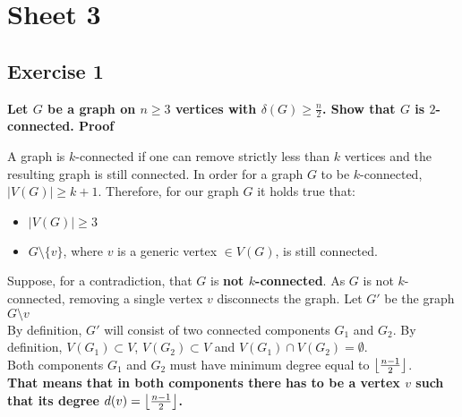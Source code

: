 \section*{Sheet 3}
\subsection*{Exercise 1}
\boldmath 
\textbf{Let $G$ be a graph on $n \geq 3$ vertices with $\delta(G) \geq \frac{n}{2}$. Show that $G$ is
$2$-connected.
\spacer
Proof} 
\unboldmath

A graph is $k$-connected if one can remove strictly less than $k$ vertices and the resulting graph is still connected. In order for a graph $G$ to be $k$-connected, $|V(G)| \geq k + 1$. Therefore, for our graph $G$ it holds true that: 
\begin{itemize}
    \item $|V(G)| \geq 3$
    \item $G \setminus \{v\}$, where $v$ is a generic vertex $\in V(G)$, is still connected.
\end{itemize}
Suppose, for a contradiction, that $G$ \boldmath is \textbf{not $k$-connected}. \unboldmath As $G$ is not $k$-connected, removing a single vertex $v$ disconnects the graph. Let $G'$ be the graph $G\setminus v$\\
\linebreak
By definition, $G'$ will consist of two connected components $G_1$ and $G_2$. By definition, $V(G_1) \subset V$, $V(G_2) \subset V$ and $V(G_1) \cap V(G_2) = \emptyset$.
\\ \linebreak
Both components $G_1$ and $G_2$ must have minimum degree equal to $\left\lfloor\frac{n - 1}{2}\right\rfloor$. \\
\boldmath
\textbf{That means that in both components there has to be a vertex $v$ such that its degree $d(v) = \left\lfloor\frac{n - 1}{2}\right\rfloor$.}
\unboldmath

